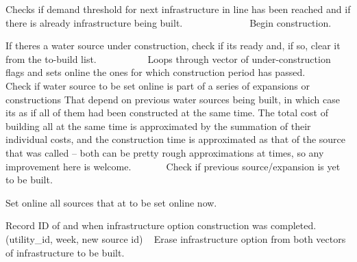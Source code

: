 Checks if demand threshold for next infrastructure in line has been reached and if there is already infrastructure being built. ~\newline
~\newline
~\newline
~\newline
~\newline
~\newline
~\newline
~\newline
 Begin construction.

If there\textquotesingle{}s a water source under construction, check if it\textquotesingle{}s ready and, if so, clear it from the to-\/build list. ~\newline
~\newline
~\newline
~\newline
~\newline
~\newline
 Loops through vector of under-\/construction flags and sets online the ones for which construction period has passed. ~\newline
~\newline
~\newline
~\newline
~\newline
 Check if water source to be set online is part of a series of expansions or constructions That depend on previous water sources being built, in which case it\textquotesingle{}s as if all of them had been constructed at the same time. The total cost of building all at the same time is approximated by the summation of their individual costs, and the construction time is approximated as that of the source that was called -- both can be pretty rough approximations at times, so any improvement here is welcome. ~\newline
~\newline
~\newline
~\newline
 Check if previous source/expansion is yet to be built.

Set online all sources that at to be set online now.

Record ID of and when infrastructure option construction was completed. (utility\+\_\+id, week, new source id) ~\newline
 Erase infrastructure option from both vectors of infrastructure to be built. \mbox{\label{classInfrastructureManager_a30910bd8edf01ae2899561b49d7719c1_a30910bd8edf01ae2899561b49d7719c1}} 
